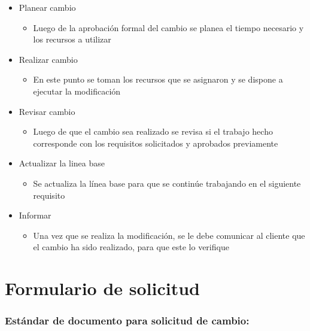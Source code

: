 \begin{itemize}
\begin{itemize}
    \end{itemize}
    \item Planear cambio
    \begin{itemize}
        \item Luego de la aprobación formal del cambio se planea el tiempo necesario y los recursos a utilizar
    \end{itemize}
    \item Realizar cambio
    \begin{itemize}
        \item En este punto se toman los recursos que se asignaron y se dispone a ejecutar la modificación
    \end{itemize}
    \item Revisar cambio
    \begin{itemize}
        \item Luego de que el cambio sea realizado se revisa si el trabajo hecho corresponde con los requisitos solicitados y aprobados previamente
    \end{itemize}
    \item Actualizar la linea base
    \begin{itemize}
        \item Se actualiza la línea base para que se continúe trabajando en el siguiente requisito
    \end{itemize}
    \item Informar
    \begin{itemize}
        \item Una vez que se realiza la modificación, se le debe comunicar al cliente que el cambio ha sido realizado, para que este lo verifique
    \end{itemize}
\end{itemize}

\section{Formulario de solicitud}

\subsubsection{Estándar de documento para solicitud de cambio:}

